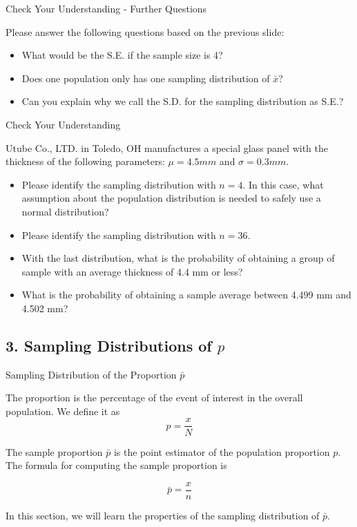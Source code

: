 \documentclass{beamer}
\begin{document}
\begin{frame}{Check Your Understanding - Further Questions}

Please answer the following questions based on the previous slide: 
\begin{itemize}
\item What would be the S.E. if the sample size is 4? 
\item Does one population only has one sampling distribution of $\bar{x}?$
\item Can you explain why we call the S.D. for the sampling distribution as S.E.? 
\end{itemize}


\end{frame}


\begin{frame}{Check Your Understanding}

Utube Co., LTD. in Toledo, OH manufactures a special glass panel with the thickness of the following parameters: $\mu = 4.5 mm$ and $\sigma = 0.3 mm$. 
\begin{itemize}
\item Please identify the sampling distribution with $n=4$. In this case, what assumption about the population distribution is needed to safely use a normal distribution? 
\item Please identify the sampling distribution with $n = 36$. 
\item With the last distribution, what is the probability of obtaining a group of sample with an average thickness of 4.4 mm or less? 
\item What is the probability of obtaining a sample average between 4.499 mm and 4.502 mm? 
\end{itemize}

\end{frame}


\subsection{3. Sampling Distributions of $p$}
\begin{frame}
\subsectionpage
\end{frame}


\begin{frame}{Sampling Distribution of the Proportion $\bar{p}$}

The proportion is the percentage of the event of interest in the overall population. We define it as $$p = \frac{x}{N}$$

\vspace{0.3cm}
The sample proportion $\bar{p}$ is the point estimator of the population proportion $p$. The formula for computing the sample proportion is 

$$\bar{p} = \frac{x}{n}$$

\vspace{0.3 cm}
In this section, we will learn the properties of the sampling distribution of $\bar{p}$.

\end{frame}
\end{document}
